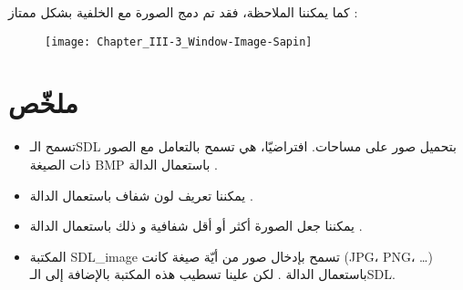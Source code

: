 كما يمكننا الملاحظة، فقد تم دمج الصورة مع الخلفية بشكل ممتاز :

\begin{figure}[H]
	\centering
	\texttt{[image: Chapter\_III-3\_Window-Image-Sapin]}
\end{figure}

\section*{ملخّص}

\begin{itemize}
	\item تسمح الـ\textenglish{SDL}
	بتحميل صور على مساحات. افتراضيّا، هي تسمح بالتعامل مع الصور ذات الصيغة
	\textenglish{BMP}
	باستعمال الدالة
	.
	\item يمكننا تعريف لون شفاف باستعمال الدالة
	.
	\item يمكننا جعل الصورة أكثر أو أقل شفافية و ذلك باستعمال الدالة 
	.
	\item المكتبة
	\textenglish{SDL\_image}
	تسمح بإدخال صور من أيّة صيغة كانت
	(\textenglish{JPG}، \textenglish{PNG}، \dots)
	باستعمال الدالة
	.
	لكن علينا تسطيب هذه المكتبة بالإضافة إلى الـ\textenglish{SDL}.
\end{itemize}
